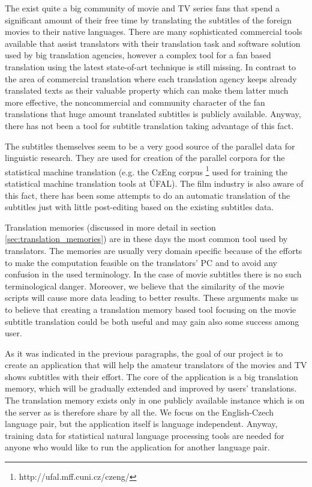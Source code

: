The exist quite a big community of movie and TV series fans that spend a significant amount of their free time by translating the subtitles of the foreign movies to their native languages. There are many sophisticated commercial tools available that assist translators with their translation task and software solution used by big translation agencies, however a complex tool for a fan based translation using the latest state-of-art technique is still missing. In contrast to the area of commercial translation where each translation agency keeps already translated texts as their valuable property which can make them latter much more effective, the noncommercial and community character of the fan translations that huge amount translated subtitles is publicly available. Anyway, there has not been a tool for subtitle translation taking advantage of this fact.

The subtitles themselves seem to be a very good source of the parallel data for linguistic research. They are used for creation of the parallel corpora for the statistical machine translation (e.g. the CzEng corpus \footnote{http://ufal.mff.cuni.cz/czeng/} used for training the statistical machine translation tools at ÚFAL). The film industry is also aware of this fact, there has been some attempts to do an automatic translation of the subtitles just with little post-editing based on the existing subtitles data.

Translation memories (discussed in more detail in section \ref{sec:translation_memories}) are in these days the most common tool used by translators. The memories are usually very domain specific because of the efforts to make the computation feasible on the translators' PC and to avoid any confusion in the used terminology. In the case of movie subtitles there is no such terminological danger. Moreover, we believe that the similarity of the movie scripts will cause more data leading to better results. These arguments make us to believe that creating a translation memory based tool focusing on the movie subtitle translation could be both useful and may gain also some success among user.

As it was indicated in the previous paragraphs, the goal of our project is to create an application that will help the amateur translators of the movies and TV shows subtitles with their effort. The core of the application is a big translation memory, which will be gradually extended and improved by users' translations. The translation memory exists only in one publicly available instance which is on the server as is therefore share by all the. We focus on the English-Czech language pair, but the application itself is language independent. Anyway, training data for statistical natural language processing tools are needed for anyone who would like to run the application for another language pair.

